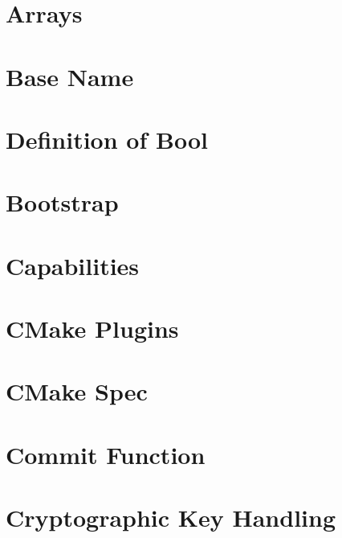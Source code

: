 \documentclass[twoside]{book}
\newcommand{\+}{\discretionary{\mbox{\scriptsize$\hookleftarrow$}}{}{}}
\begin{document}
\chapter{Arrays}
\label{doc_decisions_array_md}

\chapter{Base Name}
\label{doc_decisions_base_name_md}

\chapter{Definition of Bool}
\label{doc_decisions_boolean_md}

\chapter{Bootstrap}
\label{doc_decisions_bootstrap_md}

\chapter{Capabilities}
\label{doc_decisions_capabilities_md}

\chapter{C\+Make Plugins}
\label{doc_decisions_cmake_plugins_md}

\chapter{C\+Make Spec}
\label{doc_decisions_cmake_spec_md}

\chapter{Commit Function}
\label{doc_decisions_commit_function_md}

\chapter{Cryptographic Key Handling}
\label{doc_decisions_cryptograhic_key_handling_md}

\end{document}
